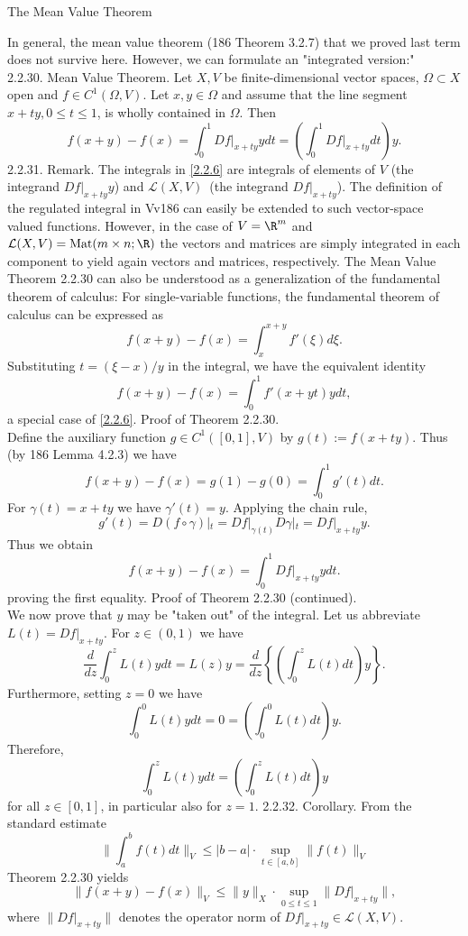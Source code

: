 \documentclass[smaller,hyperref={CJKbookmarks=true}]{beamer}
\begin{document}
\begin{frame}{The Mean Value Theorem}
\begin{spacing}{1.05}
In general, the mean value theorem (186 Theorem 3.2.7) that we proved
last term does not survive here. However, we can formulate an "integrated
version:"\\[5pt]
\alert{2.2.30. Mean Value Theorem.} Let $X,V$ be finite-dimensional vector spaces, $\Omega\subset X$ open and $f\in C^1(\Omega,V)$. Let $x,y\in\Omega$ and assume that the line segment $x+ty,0\leq t\leq 1$, is wholly contained in $\Omega$. Then
\begin{equation}\label{2.2.6}
  f(x+y)-f(x)=\int_{0}^{1}Df|_{x+ty}ydt=\left(\int_{0}^{1}Df|_{x+ty}dt\right)y.
\end{equation}
\alert{2.2.31. Remark.} The integrals in \eqref{2.2.6} are integrals of elements of $V$ (the integrand $Df|_{x+ty}y$) and $\mathcal{L}(X,V)$~(the integrand $Df|_{x+ty}$). The definition of the regulated integral in Vv186 can easily be extended to such vector-space valued functions. However, in the case of $V=\R^m$ and $\mathcal{L}(X,V)=\text{Mat}(m\times n;\R)$ the vectors and matrices are simply integrated in each component to yield again vectors and matrices, respectively.
\newpage
The Mean Value Theorem 2.2.30 can also be understood as a
generalization of the fundamental theorem of calculus: For single-variable
functions, the fundamental theorem of calculus can be expressed as
\[f(x+y)-f(x)=\int_{x}^{x+y}f'(\xi)d\xi.\]
Substituting $t=(\xi-x)/y$ in the integral, we have the equivalent identity
\[f(x+y)-f(x)=\int_{0}^{1}f'(x+yt)ydt,\]
a special case of \eqref{2.2.6}.
\newpage
\alert{Proof of Theorem 2.2.30.}\\
Define the auxiliary function $g\in C^1([0,1],V)$ by $g(t):=f(x+ty)$. Thus (by 186 Lemma 4.2.3) we have
\[f(x+y)-f(x)=g(1)-g(0)=\int_{0}^{1}g'(t)dt.\]
For $\gamma(t)=x+ty$ we have $\gamma'(t)=y$. Applying the chain rule,
\[g'(t)=D(f\circ\gamma)|_t=Df|_{\gamma(t)}D\gamma|_t=Df|_{x+ty}y.\]
Thus we obtain
\[f(x+y)-f(x)=\int_{0}^{1}Df|_{x+ty}ydt.\]
proving the first equality.
\newpage
\alert{Proof of Theorem 2.2.30 (continued).}\\
We now prove that $y$ may be "taken out" of the integral. Let us abbreviate $L(t)=Df|_{x+ty}$. For $z\in(0,1)$ we have
\[\frac{d}{dz}\int_{0}^{z}L(t)ydt=L(z)y=\frac{d}{dz}\left\{\left(\int_{0}^{z}
L(t)dt\right)y\right\}.\]
Furthermore, setting $z=0$ we have
\[\int_{0}^{0}L(t)ydt=0=\left(\int_{0}^{0}L(t)dt\right)y.\]
Therefore,
\[\int_{0}^{z}L(t)ydt=\left(\int_{0}^{z}L(t)dt\right)y\]
for all $z\in[0,1]$, in particular also for $z=1$.\quad{$\square$}
\newpage
\alert{2.2.32. Corollary.} From the standard estimate
\[\bigg\|\int_{a}^{b}f(t)dt\bigg\|_V\leq|b-a|\cdot\sup_{t\in[a,b]}\|f(t)\|_V\]
Theorem 2.2.30 yields
\[\|f(x+y)-f(x)\|_V\leq\|y\|_X\cdot\sup_{0\leq t\leq 1}\|Df|_{x+ty}\|,\]
where $\|Df|_{x+ty}\|$ denotes the operator norm of $Df|_{x+ty}\in\mathcal{L}(X,V)$.
\end{spacing}
\end{frame}
\end{document}
